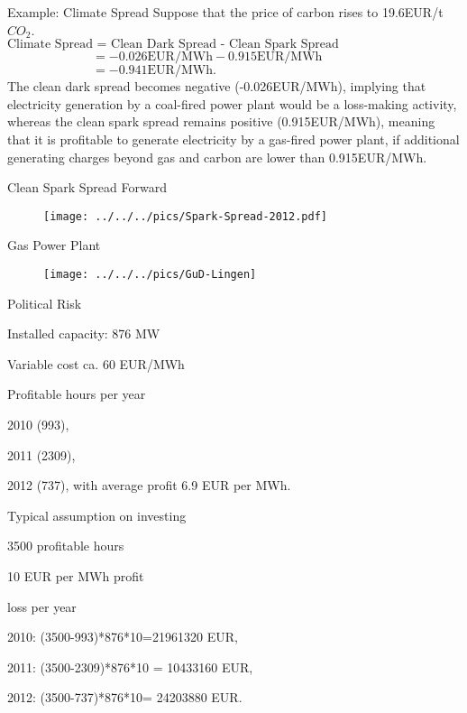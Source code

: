 {Example: Climate Spread}
Suppose that the price of carbon rises to 19.6EUR/t$CO_2$.\\
\vspace{0.25cm}
$\text{Climate Spread = Clean Dark Spread - Clean Spark Spread}$\\
$\qquad\qquad\qquad\;\;\,=-0.026\text{EUR/MWh}-0.915\text{EUR/MWh}$\\
$\qquad\qquad\qquad\;\;\,=-0.941\text{EUR/MWh}.$\\
\vspace{0.25cm}
The clean dark spread becomes negative (-0.026EUR/MWh), implying that electricity generation by a coal-fired power plant would be a loss-making activity, whereas the clean spark spread remains positive (0.915EUR/MWh), meaning that it is profitable to generate electricity by a gas-fired power plant, if additional generating charges beyond gas and carbon are lower than 0.915EUR/MWh.

{Clean Spark Spread Forward}
\begin{figure}[htp]
\centering
\texttt{[image: ../../../pics/Spark-Spread-2012.pdf]}
\end{figure}


{Gas Power Plant}
\begin{figure}[htp]
\centering
\texttt{[image: ../../../pics/GuD-Lingen]}
\label{prices}
\end{figure}

{Political Risk}
\item<1-> Installed capacity: 876 MW
\item<2-> Variable cost ca. 60 EUR/MWh
\item<3-> Profitable hours per year
\item  2010 (993),
\item 2011 (2309),
\item 2012 (737),
with average profit 6.9 EUR per MWh.
\item<4-> Typical assumption on investing
\item 3500 profitable hours
\item 10 EUR per MWh profit
\item<5-> loss per year
\item  2010: (3500-993)*876*10=21961320 EUR,
\item 2011:  (3500-2309)*876*10 = 10433160 EUR,
\item 2012: (3500-737)*876*10= 24203880 EUR.

